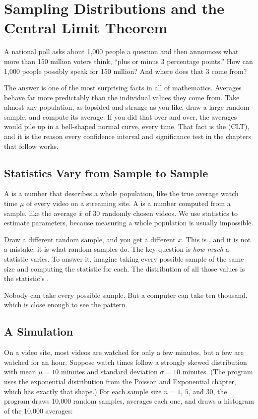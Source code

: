 \chapter{Sampling Distributions and the Central Limit Theorem}

A national poll asks about 1,000 people a question and then announces what more than
150 million voters think, ``plus or minus 3 percentage points.'' How can 1,000 people
possibly speak for 150 million? And where does that 3 come from?

The answer is one of the most surprising facts in all of mathematics. Averages
behave far more predictably than the individual values they come from. Take almost
any population, as lopsided and strange as you like, draw a large random sample, and
compute its average. If you did that over and over, the averages would pile up in a
bell-shaped normal curve, every time. That fact is the 
(CLT), and it is the reason every confidence interval and significance test in the
chapters that follow works.

\section{Statistics Vary from Sample to Sample}
A  is a number that describes a whole population, like the true
average watch time $\mu$ of every video on a streaming site. A  is a
number computed from a sample, like the average $\bar{x}$ of 30 randomly chosen videos.
We use statistics to estimate parameters, because measuring a whole population is
usually impossible.

Draw a different random sample, and you get a different $\bar{x}$. This is
, and it is not a mistake: it is what random samples do.
The key question is \emph{how much} a statistic varies. To answer it, imagine taking
every possible sample of the same size and computing the statistic for each. The
distribution of all those values is the statistic's .

Nobody can take every possible sample. But a computer can take ten thousand, which is
close enough to see the pattern.

\section{A Simulation}
On a video site, most videos are watched for only a few minutes, but a few are watched
for an hour. Suppose watch times follow a strongly skewed distribution with mean
$\mu = 10$ minutes and standard deviation $\sigma = 10$ minutes. (The program uses the
exponential distribution from the Poisson and Exponential chapter, which has exactly
that shape.) For each sample size $n = 1$, $5$, and $30$, the program draws 10,000
random samples, averages each one, and draws a histogram of the 10,000 averages:

